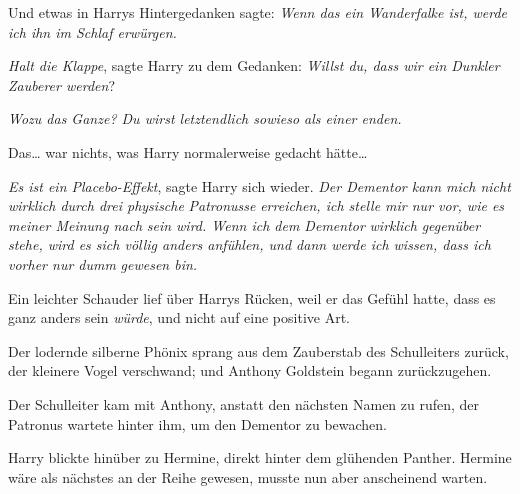 Und etwas in Harrys Hintergedanken sagte: \emph{Wenn das ein Wanderfalke ist, werde ich ihn im Schlaf erwürgen.}

\emph{Halt die Klappe}, sagte Harry zu dem Gedanken: \emph{Willst du, dass wir ein Dunkler Zauberer werden}?

\emph{Wozu das Ganze? Du wirst letztendlich sowieso als einer enden.}

Das… war nichts, was Harry normalerweise gedacht hätte…

\emph{Es ist ein Placebo-Effekt}, sagte Harry sich wieder. \emph{Der Dementor kann mich nicht wirklich durch drei physische} \emph{Patronusse} \emph{erreichen, ich stelle mir nur vor, wie es meiner Meinung nach} \emph{sein wird. Wenn ich dem Dementor} \emph{wirklich} \emph{gegenüber stehe, wird es sich völlig anders anfühlen, und dann werde ich wissen, dass ich vorher nur dumm} \emph{gewesen bin.}

Ein leichter Schauder lief über Harrys Rücken, weil er das Gefühl hatte, dass es ganz anders sein \emph{würde}, und nicht auf eine positive Art.

Der lodernde silberne Phönix sprang aus dem Zauberstab des Schulleiters zurück, der kleinere Vogel verschwand; und Anthony Goldstein begann zurückzugehen.

Der Schulleiter kam mit Anthony, anstatt den nächsten Namen zu rufen, der Patronus wartete hinter ihm, um den Dementor zu bewachen.

Harry blickte hinüber zu Hermine, direkt hinter dem glühenden Panther. Hermine wäre als nächstes an der Reihe gewesen, musste nun aber anscheinend warten.

